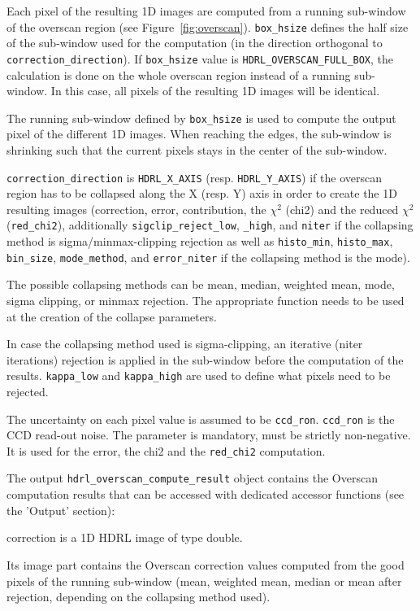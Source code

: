 Each pixel of the resulting 1D images are computed from a 
running sub-window of the overscan region (see Figure~\ref{fig:overscan}). 
\verb+box_hsize+ defines the half size of the sub-window used for the 
computation (in the direction orthogonal to \verb+correction_direction+). 
If \verb+box_hsize+ value is \verb+HDRL_OVERSCAN_FULL_BOX+, the calculation is
done on the whole overscan region instead of a running sub-window. 
In this case, all pixels of the resulting 1D images will be identical.

The running sub-window defined by \verb+box_hsize+ is used to compute
the output pixel of the different 1D images.
When reaching the edges, the sub-window is shrinking such that the
current pixels stays in the center of the sub-window.

\verb+correction_direction+ is \verb+HDRL_X_AXIS+
(resp. \verb+HDRL_Y_AXIS+) if the overscan region has to be collapsed
along the X (resp. Y) axis in order to create the 1D resulting images
(correction, error, contribution, the $\chi^{2}$ (chi2) and the
reduced $\chi^{2}$ (\verb+red_chi2+), additionally
\verb+sigclip_reject_low+, \verb+_high+, and \verb+niter+ if the
collapsing method is sigma/minmax-clipping rejection as well as
\verb+histo_min+, \verb+histo_max+, \verb+bin_size+,
\verb+mode_method+, and \verb+error_niter+ if the collapsing method is
the mode).

The possible collapsing methods can be mean, median, weighted mean,
mode, sigma clipping, or minmax rejection. The appropriate function
needs to be used at the creation of the collapse parameters.

In case the collapsing method used is sigma-clipping, an iterative 
(niter iterations) rejection is applied in the sub-window before the 
computation of the results. \verb+kappa_low+ and \verb+kappa_high+ are used to
define what pixels need to be rejected.

The uncertainty on each pixel value is assumed to be \verb+ccd_ron+. 
\verb+ccd_ron+ is the CCD read-out noise. The parameter is mandatory, 
must be strictly non-negative. It is used for the error, the chi2 and 
the \verb+red_chi2+ computation.

The output \verb+hdrl_overscan_compute_result+ object contains the Overscan 
computation results that can be accessed with dedicated accessor
functions (see the 'Output' section):

correction is a 1D HDRL image of type double.

Its image part contains the Overscan correction values computed from the 
good pixels of the running sub-window (mean, weighted mean, median or mean 
after rejection, depending on the collapsing method used).

